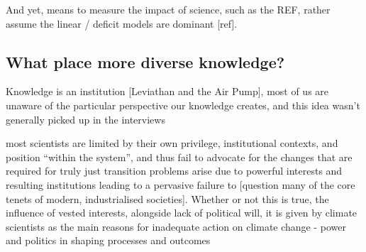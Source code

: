 And yet, means to measure the impact of science, such as the REF, rather assume the linear / deficit models are dominant [ref]. 
\subsection{What place more diverse knowledge?}

Knowledge is an institution [Leviathan and the Air Pump], most of us are unaware of the particular perspective our knowledge creates, and this idea wasn't generally picked up in the interviews

\cite{Bendell2024} most scientists are limited by their own privilege, institutional contexts, and position ``within the system'', and thus fail to advocate for the changes that are required for truly just transition  
\cite{StoddardEtAl2021} problems arise due to powerful interests and resulting institutions leading to a pervasive failure to [question many of the core tenets of modern, industrialised societies]. Whether or not this is true, the influence of vested interests, alongside lack of political will, it is given by climate scientists as the main reasons for inadequate action on climate change \cite{Carrington2024} 
\cite{TurnhoutMWKL2020} - power and politics in shaping processes and outcomes
\fi